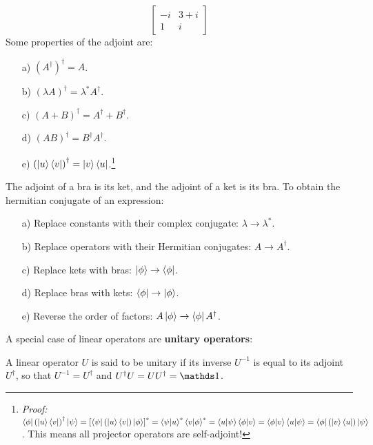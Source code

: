 \begin{itemize}
\begin{equation}
\begin{bmatrix}
            -i & 3 + i \\
            1 & i
        \end{bmatrix}
    \end{equation}
    Some properties of the adjoint are:
    \begin{enumerate}
        \item[a)] $\left(A^\dagger\right)^\dagger = A$.
        \item[b)] $\left(\lambda A\right)^\dagger = \lambda^*A^\dagger$.
        \item[c)] $\left(A + B\right)^\dagger = A^\dagger + B^\dagger$.
        \item[d)] $\left(A B\right)^\dagger = B^\dagger A^\dagger$.
        \item [e)] $\left(\ket{u}\bra{v}\right)^\dagger = \ket{v}\bra{u}$.\footnote{\textit{Proof:} $\bra{\phi}\left(\ket{u}\bra{v}\right)^\dagger\ket{\psi} = \left[\bra{\psi}\left(\ket{u}\bra{v}\right)\ket{\phi}\right]^* = \braket{\psi|u}^*\braket{v|\phi}^* = \braket{u|\psi}\braket{\phi|v} = \braket{\phi|v}\braket{u|\psi} = \bra{\phi}\left(\ket{v}\bra{u}\right)\ket{\psi}$. This means all projector operators are self-adjoint!}
    \end{enumerate}
    The adjoint of a bra is its ket, and the adjoint of a ket is its bra.
    To obtain the hermitian conjugate of an expression:
    \begin{enumerate}
        \item[a)] Replace constants with their complex conjugate: $\lambda \to \lambda^*$.
        \item[b)] Replace operators with their Hermitian conjugates: $A\to A^\dagger$.
        \item[c)] Replace kets with bras: $\ket{\phi}\to\bra{\phi}$.
        \item[d)] Replace bras with kets: $\bra{\phi}\to\ket{\phi}$.
        \item[e)] Reverse the order of factors: $A\ket{\phi} \to \bra{\phi}A^\dagger$.

    \end{enumerate}
\end{itemize}

A special case of linear operators are \textbf{unitary operators}:

\begin{definition}
    A linear operator $U$ is said to be unitary if its inverse $U^{-1}$ is equal to its adjoint $U^\dagger$, so that $U^{-1} = U^\dagger$ and $U^\dagger U = UU^\dagger = \Imat$.
\end{definition}

